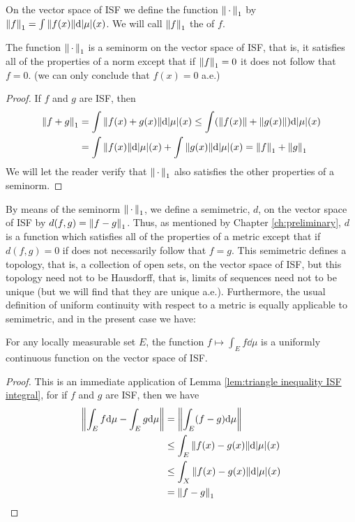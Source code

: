 \begin{definition}
On the vector space of ISF we define the function $\norm{\,\cdot\,}_1$ by $\norm{f}_1=\int\norm{f(x)}\dd|\mu|(x)$. We will call $\norm{f}_1$ the  of $f$.
\end{definition}

\begin{lemma}
\label{lem:L1 seminorm on ISF}
The function $\norm{\,\cdot\,}_1$ is a seminorm on the vector space of ISF, that is, it satisfies all of the properties of a norm except that if $\norm{f}_1=0$ it does not follow that $f=0$. (we can only conclude that $f(x)=0$ a.e.)
\end{lemma}
\begin{proof}
If $f$ and $g$ are ISF, then
\begin{align*}
    \norm{f+g}_1&=\int\norm{f(x)+g(x)}\dd|\mu|(x)\leq\int(\norm{f(x)}+\norm{g(x)})\dd|\mu|(x)\\
    &=\int\norm{f(x)}\dd|\mu|(x)+\int\norm{g(x)}\dd|\mu|(x)=\norm{f}_1+\norm{g}_1
\end{align*}
We will let the reader verify that $\norm{\,\cdot\,}_1$ also satisfies the other properties of a seminorm.
\end{proof}

By means of the seminorm $\norm{\,\cdot\,}_1$, we define a semimetric, $d$, on the vector space of ISF by $d(f,g)=\norm{f-g}_1$. Thus, as mentioned by Chapter \ref{ch:preliminary}, $d$ is a function which satisfies all of the properties of a metric except that if $d(f,g)=0$ if does not necessarily follow that $f=g$. This semimetric defines a topology, that is, a collection of open sets, on the vector space of ISF, but this topology need not to be Hausdorff, that is, limits of sequences need not to be unique (but we will find that they are unique a.e.). Furthermore, the usual definition of uniform continuity with respect to a metric is equally applicable to semimetric, and in the present case we have:

\begin{lemma}
\label{lem:integral on E uniform cts on ISF}
For any locally measurable set $E$, the function $f\mapsto\int_Ef\dd\mu$ is a uniformly continuous function on the vector space of ISF.
\end{lemma}

\begin{proof}
This is an immediate application of Lemma \ref{lem:triangle inequality ISF integral}, for if $f$ and $g$ are ISF, then we have
\begin{align*}
    \norm{\int_Ef\dd\mu-\int_Eg\dd\mu}&=\norm{\int_E(f-g)\dd\mu}\\
    &\leq\int_E\norm{f(x)-g(x)}\dd|\mu|(x)\\
    &\leq\int_X\norm{f(x)-g(x)}\dd|\mu|(x)\\
    &=\norm{f-g}_1
\end{align*}
\end{proof}

